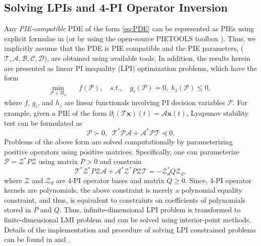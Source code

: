 \documentclass[letterpaper, 10 pt, conference]{ieeeconf}
\newcommand{\mcl}[1]{\mathcal{#1}}
\newcommand{\mbf}[1]{\mathbf{#1}}
\theoremstyle{definition}
\begin{document}
\subsection{Solving LPIs and 4-PI Operator Inversion}
Any \textit{PIE-compatible} PDE of the form \eqref{eq:PDE} can be represented as PIEs using explicit formulae in \cite{shivakumar_extension_2024} (or by using the open-source PIETOOLS toolbox \cite{shivakumar_pietools_2025}). Thus, we implicitly assume that the PDE is PIE compatible and the PIE parameters, ($\mcl{T}, \mcl{A}, \mcl{B}, \mcl{C}, \mcl{D}$), are obtained using available tools. In addition, the results herein are presented as linear PI inequality (LPI) optimization problems, which have the form
\begin{align}\label{eq:LPI}
\min_{\mcl P\in \Pi_4}&\quad   f(\mcl P),\quad 
s.t., \quad g_i(\mcl P) = 0,\; h_j(\mcl P)\le 0,
\end{align}
where $f$, $g_i$, and $h_j$ are linear functionals involving PI decision variables $\mcl P$. For example, given a PIE of the form $\partial_t (\mcl T\mbf x)(t) = \mcl A \mbf x(t)$, Lyapunov stability test can be formulated as
\[
\mcl P\succ 0, \;\; \mcl T^*\mcl P\mcl A+\mcl A^*\mcl P\mcl T\preceq 0.
\]
Problems of the above form are solved computationally by parameterizing positive operators using positive matrices. Specifically, one can parameterize $\mcl P = \mcl Z^*P\mcl Z$ using matrix $P>0$ and constrain
\[
\mcl T^*\mcl Z^*P\mcl Z\mcl A+ \mcl A^*\mcl Z^*P\mcl Z\mcl T = -\mcl Z_d^* Q\mcl Z_d,
\]
where $\mcl Z$ and $\mcl Z_d$ are 4-PI operator bases and matrix $Q\ge 0$. Since, 4-PI operator kernels are polynomials, the above constraint is merely a polynomial equality constraint, and thus, is equivalent to constraints on coefficients of polynomials stored in $P$ and $Q$. Thus, infinite-dimensional LPI problem is transformed to finite-dimensional LMI problem and can be solved using interior-point methods. Details of the implementation and procedure of solving LPI constrained problems can be found in \cite{shivakumar_pietools_2025} and \cite{PEET2021109473}.
\end{document}
